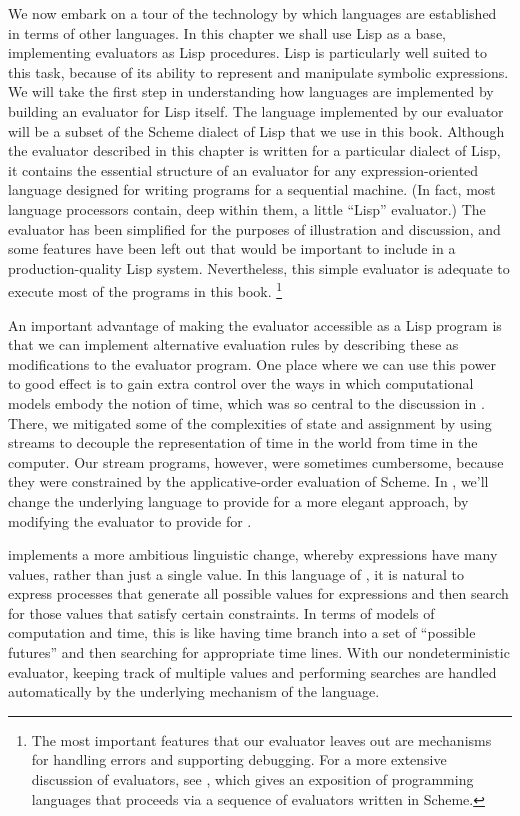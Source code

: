 We now embark on a tour of the technology by which languages are established in terms of other languages.
In this chapter we shall use Lisp as a base, implementing evaluators as Lisp procedures.
Lisp is particularly well suited to this task, because of its ability to represent and manipulate symbolic expressions.
We will take the first step in understanding how languages are implemented by building an evaluator for Lisp itself.
The language implemented by our evaluator will be a subset of the Scheme dialect of Lisp that we use in this book.
Although the evaluator described in this chapter is written for a particular dialect of Lisp, it contains the essential structure of an evaluator for any expression-oriented language designed for writing programs for a sequential machine.
(In fact, most language processors contain, deep within them, a little “Lisp” evaluator.)
The evaluator has been simplified for the purposes of illustration and discussion, and some features have been left out that would be important to include in a production-quality Lisp system.
Nevertheless, this simple evaluator is adequate to execute most of the programs in this book.%
\footnote{
	The most important features that our evaluator leaves out are mechanisms for handling errors and supporting debugging.
	For a more extensive discussion of evaluators, see , which gives an exposition of programming languages that proceeds via a sequence of evaluators written in Scheme.
}

An important advantage of making the evaluator accessible as a Lisp program is that we can implement alternative evaluation rules by describing these as modifications to the evaluator program.
One place where we can use this power to good effect is to gain extra control over the ways in which computational models embody the notion of time, which was so central to the discussion in .
There, we mitigated some of the complexities of state and assignment by using streams to decouple the representation of time in the world from time in the computer.
Our stream programs, however, were sometimes cumbersome, because they were constrained by the applicative-order evaluation of Scheme.
In , we’ll change the underlying language to provide for a more elegant approach, by modifying the evaluator to provide for .

 implements a more ambitious linguistic change, whereby expressions have many values, rather than just a single value.
In this language of , it is natural to express processes that generate all possible values for expressions and then search for those values that satisfy certain constraints.
In terms of models of computation and time, this is like having time branch into a set of “possible futures” and then searching for appropriate time lines.
With our nondeterministic evaluator, keeping track of multiple values and performing searches are handled automatically by the underlying mechanism of the language.


